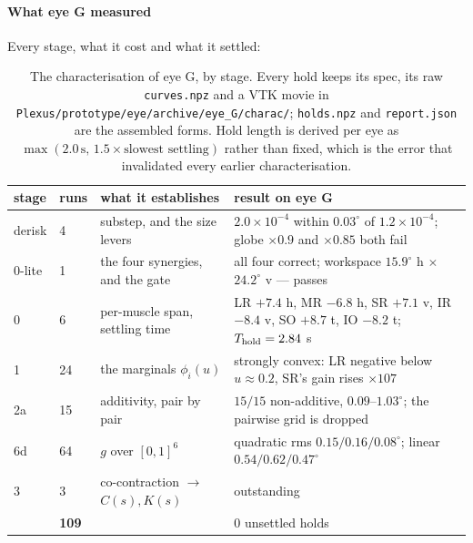 \documentclass[10pt]{article}
\begin{document}
\paragraph{What eye G measured}

Every stage, what it cost and what it settled:

\begin{table}[H]\centering\small
\begin{tabularx}{\textwidth}{@{}llX>{\raggedright\arraybackslash}X@{}}\toprule
stage & runs & what it establishes & result on eye G \\\midrule
derisk & 4 & substep, and the size levers & $2.0\!\times\!10^{-4}$ within $0.03^{\circ}$ of $1.2\!\times\!10^{-4}$; globe $\times0.9$ and $\times0.85$ both fail \\
0-lite & 1 & the four synergies, and the gate & all four correct; workspace $15.9^{\circ}$ h $\times$ $24.2^{\circ}$ v --- passes \\
0 & 6 & per-muscle span, settling time & LR $+7.4$ h, MR $-6.8$ h, SR $+7.1$ v, IR $-8.4$ v, SO $+8.7$ t, IO $-8.2$ t; $T_{\rm hold}=2.84$ s \\
1 & 24 & the marginals $\phi_i(u)$ & strongly convex: LR negative below $u\!\approx\!0.2$, SR's gain rises $\times107$ \\
2a & 15 & additivity, pair by pair & $15/15$ non-additive, $0.09$--$1.03^{\circ}$; the pairwise grid is dropped \\
6d & 64 & $g$ over $[0,1]^6$ & quadratic rms $0.15/0.16/0.08^{\circ}$; linear $0.54/0.62/0.47^{\circ}$ \\
3 & 3 & co-contraction $\to$ $C(s),K(s)$ & outstanding \\\midrule
& \textbf{109} & & $0$ unsettled holds \\
\bottomrule\end{tabularx}
\caption{\small The characterisation of eye G, by stage. Every hold keeps its spec, its raw
\texttt{curves.npz} and a VTK movie in \texttt{Plexus/prototype/eye/archive/eye\_G/charac/};
\texttt{holds.npz} and \texttt{report.json} are the assembled forms. Hold length is derived
per eye as $\max(2.0\,\mathrm{s},\,1.5\times\text{slowest settling})$ rather than fixed,
which is the error that invalidated every earlier characterisation.}
\label{tab:stages}
\end{table}
\end{document}
